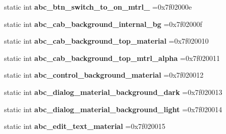 \begin{DoxyCompactItemize}
\item 
\mbox{\label{classandroid_1_1support_1_1v4_1_1R_1_1drawable_ac7ca78afbd8ef5309c62eb06a6167c7b}} 
static int {\bfseries abc\+\_\+btn\+\_\+switch\+\_\+to\+\_\+on\+\_\+mtrl\+\_} =0x7f02000e
\item 
\mbox{\label{classandroid_1_1support_1_1v4_1_1R_1_1drawable_a911bb95eb202923eb1f4b3298ad1664d}} 
static int {\bfseries abc\+\_\+cab\+\_\+background\+\_\+internal\+\_\+bg} =0x7f02000f
\item 
\mbox{\label{classandroid_1_1support_1_1v4_1_1R_1_1drawable_ad9a1c602f2535ec572027b448baaafd3}} 
static int {\bfseries abc\+\_\+cab\+\_\+background\+\_\+top\+\_\+material} =0x7f020010
\item 
\mbox{\label{classandroid_1_1support_1_1v4_1_1R_1_1drawable_a3f44251d83b860a46a464397005e4ab0}} 
static int {\bfseries abc\+\_\+cab\+\_\+background\+\_\+top\+\_\+mtrl\+\_\+alpha} =0x7f020011
\item 
\mbox{\label{classandroid_1_1support_1_1v4_1_1R_1_1drawable_a53821bd203e4d24171e475d90e1c995c}} 
static int {\bfseries abc\+\_\+control\+\_\+background\+\_\+material} =0x7f020012
\item 
\mbox{\label{classandroid_1_1support_1_1v4_1_1R_1_1drawable_aa3e2bc8d7d05db3c6c54767a6aedcabf}} 
static int {\bfseries abc\+\_\+dialog\+\_\+material\+\_\+background\+\_\+dark} =0x7f020013
\item 
\mbox{\label{classandroid_1_1support_1_1v4_1_1R_1_1drawable_ad15135202a11c0c97f01abe404c6622b}} 
static int {\bfseries abc\+\_\+dialog\+\_\+material\+\_\+background\+\_\+light} =0x7f020014
\item 
\mbox{\label{classandroid_1_1support_1_1v4_1_1R_1_1drawable_acd7f97c09002dece3f6243e39e43c9a2}} 
static int {\bfseries abc\+\_\+edit\+\_\+text\+\_\+material} =0x7f020015

\end{DoxyCompactItemize}
